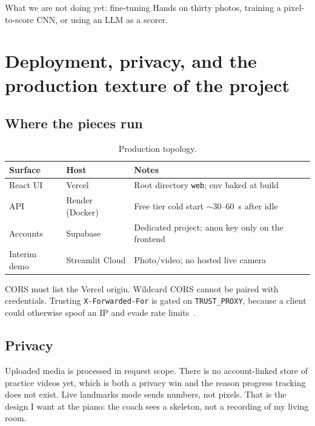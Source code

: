 \documentclass[11pt,a4paper]{article}
\newcommand{\code}[1]{\texttt{#1}}
\begin{document}
What we are not doing yet: fine-tuning Hands on thirty photos, training a pixel-to-score CNN, or using an LLM as a scorer.

\section{Deployment, privacy, and the production texture of the project}
\label{sec:deploy}

\subsection{Where the pieces run}

\begin{table}[ht]
\centering
\caption{Production topology.}
\label{tab:deploy}
\begin{tabularx}{\textwidth}{@{}ll>{\raggedright\arraybackslash}X@{}}
\toprule
\textbf{Surface} & \textbf{Host} & \textbf{Notes} \\
\midrule
React UI & Vercel & Root directory \code{web}; env baked at build \\
API & Render (Docker) & Free tier cold start \(\sim\)30--60~s after idle \\
Accounts & Supabase & Dedicated project; anon key only on the frontend \\
Interim demo & Streamlit Cloud & Photo/video; no hosted live camera \\
\bottomrule
\end{tabularx}
\end{table}

CORS must list the Vercel origin.
Wildcard CORS cannot be paired with credentials.
Trusting \code{X-Forwarded-For} is gated on \code{TRUST\_PROXY}, because a client could otherwise spoof an IP and evade rate limits~\cite{errors,deploy}.

\subsection{Privacy}

Uploaded media is processed in request scope.
There is no account-linked store of practice videos yet, which is both a privacy win and the reason progress tracking does not exist.
Live landmarks mode sends numbers, not pixels.
That is the design I want at the piano: the coach sees a skeleton, not a recording of my living room.
\end{document}

